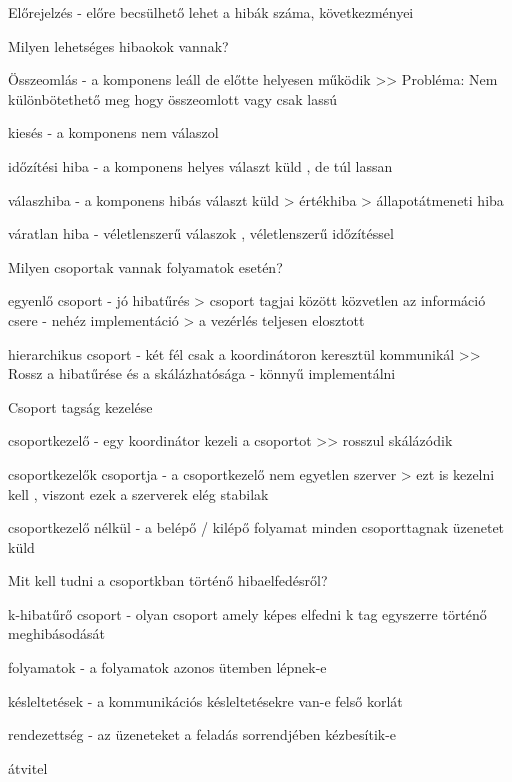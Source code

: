 \documentclass[12pt]{article}
\begin{document}
\begin{description}[style=unboxed]
    \item Előrejelzés
        - előre becsülhető lehet a hibák száma, következményei
    \item  Milyen lehetséges hibaokok vannak?
    \item Összeomlás
        - a komponens leáll de előtte helyesen működik
        >> Probléma: Nem különbötethető meg hogy összeomlott vagy csak lassú 
    \item kiesés
        - a komponens nem válaszol
    \item időzítési hiba
        - a komponens helyes választ küld , de túl lassan
    \item válaszhiba
        - a komponens hibás választ küld
        > értékhiba
        > állapotátmeneti hiba
    \item váratlan hiba
        - véletlenszerű válaszok , véletlenszerű időzítéssel
    \item  Milyen csoportak vannak folyamatok esetén?
    \item egyenlő csoport
        - jó hibatűrés
        > csoport tagjai között közvetlen az információ csere
        - nehéz implementáció
        > a vezérlés teljesen elosztott
    \item hierarchikus csoport
        - két fél csak a koordinátoron keresztül kommunikál
        >> Rossz a hibatűrése és a skálázhatósága
        - könnyű implementálni
    \item  Csoport tagság kezelése
    \item csoportkezelő
        - egy koordinátor kezeli a csoportot
        >> rosszul skálázódik
    \item csoportkezelők csoportja
        - a csoportkezelő nem egyetlen szerver
        > ezt is kezelni kell , viszont ezek a szerverek elég stabilak
    \item csoportkezelő nélkül
        - a belépő / kilépő folyamat minden csoporttagnak üzenetet küld
    \item  Mit kell tudni a csoportkban történő hibaelfedésről?
    \item k-hibatűrő csoport
        - olyan csoport amely képes elfedni k tag egyszerre történő meghibásodását
    \item folyamatok
        - a folyamatok azonos ütemben lépnek-e
    \item késleltetések
        - a kommunikációs késleltetésekre van-e felső korlát
    \item rendezettség
        - az üzeneteket a feladás sorrendjében kézbesítik-e
    \item átvitel

\end{description}
\end{document}
